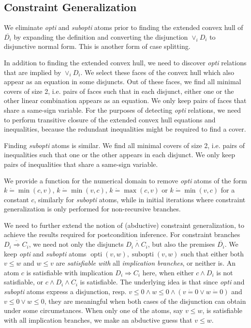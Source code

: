 \documentclass{article}
\newcommand{\tmem}[1]{{\em #1\/}}
\newcommand{\tmop}[1]{\ensuremath{\operatorname{#1}}}
\begin{document}
\subsection{Constraint Generalization}

We eliminate {\tmem{opti}} and {\tmem{subopti}} atoms prior to finding the
extended convex hull of $\overline{D_i}$ by expanding the definition and
converting the disjunction $\vee_i D_i$ to disjunctive normal form. This is
another form of case splitting.

In addition to finding the extended convex hull, we need to discover
{\tmem{opti}} relations that are implied by $\vee_i D_i$. We select these
faces of the convex hull which also appear as an equation in some disjuncts.
Out of these faces, we find all minimal covers of size 2, i.e. pairs of faces
such that in each disjunct, either one or the other linear combination appears
as an equation. We only keep pairs of faces that share a same-sign variable.
For the purposes of detecting {\tmem{opti}} relations, we need to perform
transitive closure of the extended convex hull equations and inequalities,
because the redundant inequalities might be required to find a cover.

Finding {\tmem{subopti}} atoms is similar. We find all minimal covers of size
2, i.e. pairs of inequalities such that one or the other appears in each
disjunct. We only keep pairs of inequalities that share a same-sign variable.

We provide a function for the numerical domain to remove {\tmem{opti}} atoms
of the form $k \dot{=} \min (c, v)$, $k \dot{=} \min (v, c)$, $k \dot{=} \max
(c, v)$ or $k \dot{=} \min (v, c)$ for a constant $c$, similarly for
{\tmem{subopti}} atoms, while in initial iterations where constraint
generalization is only performed for non-recursive branches.

We need to further extend the notion of (abductive) constraint generalization,
to achieve the results required for postcondition inference. For constraint
branches $\overline{D_i \Rightarrow C_i}$, we need not only the disjuncts
$\overline{D_i \wedge C_i}$, but also the premises $\overline{D_i}$. We keep
{\tmem{opti}} and {\tmem{subopti}} atoms $\tmop{opti} (v, w), \tmop{subopti}
(v, w)$ such that either both $v \leqslant w$ and $w \leqslant v$ are
{\tmem{satisfiable with}} all {\tmem{implication branches}}, or neither is. An
atom $c$ is satisfiable with implication $D_i \Rightarrow C_i$ here, when
either $c \wedge D_i$ is not satisfiable, or $c \wedge D_i \wedge C_i$ is
satisfiable. The underlying idea is that since {\tmem{opti}} and
{\tmem{subopti}} atoms express a disjunction, resp. $v \leqslant 0 \wedge w
\leqslant 0 \wedge (v \dot{=} 0 \vee w \dot{=} 0)$ and $v \leqslant 0 \vee w
\leqslant 0$, they are meaningful when both cases of the disjunction can
obtain under some circumstances. When only one of the atoms, say $v \leqslant
w$, is satisfiable with all implication branches, we make an abductive guess
that $v \leqslant w$.
\end{document}
